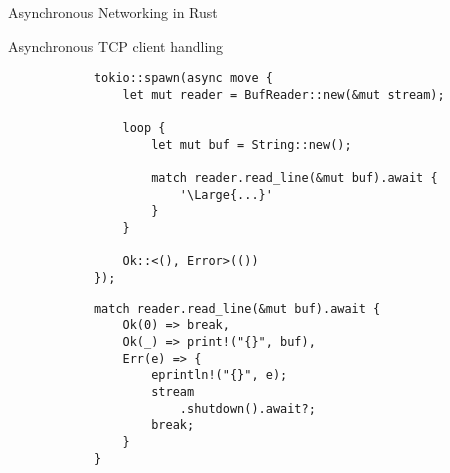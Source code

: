 \begin{frame}[fragile]{Asynchronous Networking in Rust}
    \begin{block}{Asynchronous TCP client handling}
        \begin{overprint}
            \begin{verbatim}
            tokio::spawn(async move {
                let mut reader = BufReader::new(&mut stream);
            
                loop {
                    let mut buf = String::new();
            
                    match reader.read_line(&mut buf).await {
                        '\Large{...}'
                    }
                }
            
                Ok::<(), Error>(())
            });
            \end{verbatim}

            \begin{verbatim}
            match reader.read_line(&mut buf).await {
                Ok(0) => break,
                Ok(_) => print!("{}", buf),
                Err(e) => {
                    eprintln!("{}", e);
                    stream
                        .shutdown().await?;
                    break;
                }
            }
            \end{verbatim}
        \end{overprint}
    \end{block}

\end{frame}
